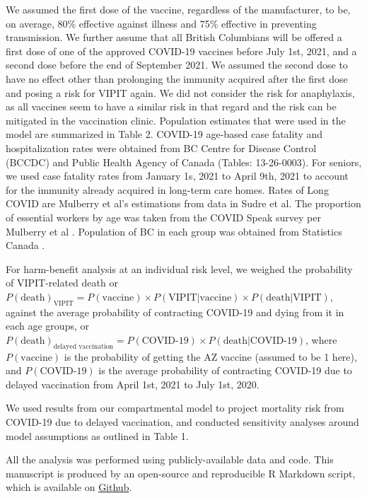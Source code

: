\documentclass[]{interact}
\theoremstyle{plain}%
\theoremstyle{definition}
\theoremstyle{remark}
\begin{document}
We assumed the first dose of the vaccine, regardless of the
manufacturer, to be, on average, 80\% effective against illness and 75\%
effective in preventing transmission. We further assume that all British
Columbians will be offered a first dose of one of the approved COVID-19
vaccines before July 1st, 2021, and a second dose before the end of
September 2021. We assumed the second dose to have no effect other than
prolonging the immunity acquired after the first dose and posing a risk
for VIPIT again. We did not consider the risk for anaphylaxis, as all
vaccines seem to have a similar risk in that regard and the risk can be
mitigated in the vaccination clinic. Population estimates that were used
in the model are summarized in Table 2. COVID-19 age-based case fatality
and hospitalization rates were obtained from BC Centre for Disease
Control (BCCDC) \citep{bccdc_british_2021} and Public Health Agency of
Canada (Tables: 13-26-0003)\citep{statistics_canada_preliminary_2021}.
For seniors, we used case fatality rates from January 1s, 2021 to April
9th, 2021 to account for the immunity already acquired in long-term care
homes. Rates of Long COVID are Mulberry et al's estimations from data in
Sudre et al\citep{sudre_attributes_2021}. The proportion of essential
workers by age was taken from the COVID Speak survey per Mulberry et al
\citep{mulberry_vaccine_2021}. Population of BC in each group was
obtained from Statistics Canada \citep{statistics_canada_census_2017}.

For harm-benefit analysis at an individual risk level, we weighed the
probability of VIPIT-related death or
\(P(\text{death})_{\text{VIPIT}} = P(\text{vaccine}) \times P(\text{VIPIT}|\text{vaccine}) \times P(\text{death}|\text{VIPIT})\),
against the average probability of contracting COVID-19 and dying from
it in each age groups, or
\(P(\text{death})_{\text{delayed vaccination}} = P(\text{COVID-19}) \times P(\text{death}|\text{COVID-19})\),
where \(P(\text{vaccine})\) is the probability of getting the AZ vaccine
(assumed to be 1 here), and \(P(\text{COVID-19})\) is the average
probability of contracting COVID-19 due to delayed vaccination from
April 1st, 2021 to July 1st, 2020.

We used results from our compartmental model to project mortality risk
from COVID-19 due to delayed vaccination, and conducted sensitivity
analyses around model assumptions as outlined in Table 1.

All the analysis was performed using publicly-available data and code.
This manuscript is produced by an open-source and reproducible R
Markdown script, which is available on
\href{https://github.com/aminadibi/astrazenecaVIPIT}{Github}.
\end{document}
